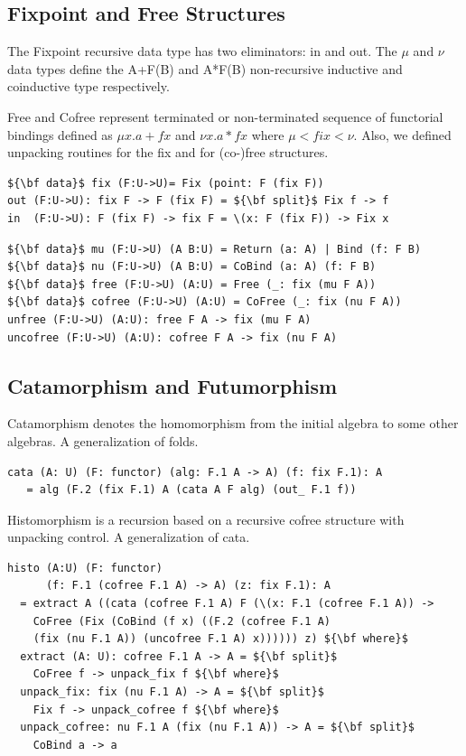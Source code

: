 \documentclass{article}
\begin{document}
\subsection{Fixpoint and Free Structures}

The Fixpoint recursive data type has two eliminators: in and out.
The $\mu$ and $\nu$ data types define the A+F(B) and A*F(B) non-recursive
inductive and coinductive type respectively.

Free and Cofree represent terminated or non-terminated sequence of functorial
bindings defined as $\mu x . a + f x$ and $\nu x . a * f x$ where $\mu < fix < \nu$.
Also, we defined unpacking routines for the fix and for (co-)free structures.

\begin{lstlisting}[mathescape=true]
${\bf data}$ fix (F:U->U)= Fix (point: F (fix F))
out (F:U->U): fix F -> F (fix F) = ${\bf split}$ Fix f -> f
in  (F:U->U): F (fix F) -> fix F = \(x: F (fix F)) -> Fix x
\end{lstlisting}
\begin{lstlisting}[mathescape=true]
${\bf data}$ mu (F:U->U) (A B:U) = Return (a: A) | Bind (f: F B)
${\bf data}$ nu (F:U->U) (A B:U) = CoBind (a: A) (f: F B)
${\bf data}$ free (F:U->U) (A:U) = Free (_: fix (mu F A))
${\bf data}$ cofree (F:U->U) (A:U) = CoFree (_: fix (nu F A))
unfree (F:U->U) (A:U): free F A -> fix (mu F A)
uncofree (F:U->U) (A:U): cofree F A -> fix (nu F A)
\end{lstlisting}

\subsection{Catamorphism and Futumorphism}

Catamorphism denotes the homomorphism from the initial algebra to some other algebras.
A generalization of folds.

\begin{lstlisting}[mathescape=true]
cata (A: U) (F: functor) (alg: F.1 A -> A) (f: fix F.1): A
   = alg (F.2 (fix F.1) A (cata A F alg) (out_ F.1 f))
\end{lstlisting}

Histomorphism is a recursion based on a recursive cofree structure with unpacking control.
A generalization of cata.

\begin{lstlisting}[mathescape=true]
histo (A:U) (F: functor)
      (f: F.1 (cofree F.1 A) -> A) (z: fix F.1): A
  = extract A ((cata (cofree F.1 A) F (\(x: F.1 (cofree F.1 A)) ->
    CoFree (Fix (CoBind (f x) ((F.2 (cofree F.1 A)
    (fix (nu F.1 A)) (uncofree F.1 A) x)))))) z) ${\bf where}$
  extract (A: U): cofree F.1 A -> A = ${\bf split}$
    CoFree f -> unpack_fix f ${\bf where}$
  unpack_fix: fix (nu F.1 A) -> A = ${\bf split}$
    Fix f -> unpack_cofree f ${\bf where}$
  unpack_cofree: nu F.1 A (fix (nu F.1 A)) -> A = ${\bf split}$
    CoBind a -> a
\end{lstlisting}
\end{document}

